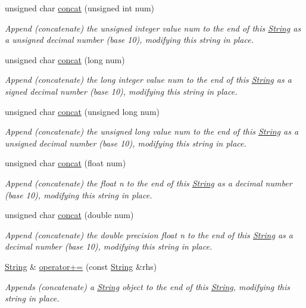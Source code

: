 \begin{DoxyCompactItemize}
unsigned char \hyperlink{class_string_af9c20f944d8a4687808017388047d155}{concat} (unsigned int num)
\begin{DoxyCompactList}\small\item\em Append (concatenate) the unsigned integer value num to the end of this \hyperlink{class_string}{String} as a unsigned decimal number (base 10), modifying this string in place. \end{DoxyCompactList}\item 
unsigned char \hyperlink{class_string_a92a456f8679a19d2221ec43841238ead}{concat} (long num)
\begin{DoxyCompactList}\small\item\em Append (concatenate) the long integer value num to the end of this \hyperlink{class_string}{String} as a signed decimal number (base 10), modifying this string in place. \end{DoxyCompactList}\item 
unsigned char \hyperlink{class_string_ad502777b7549182fe9b1a14879acf307}{concat} (unsigned long num)
\begin{DoxyCompactList}\small\item\em Append (concatenate) the unsigned long value num to the end of this \hyperlink{class_string}{String} as a unsigned decimal number (base 10), modifying this string in place. \end{DoxyCompactList}\item 
unsigned char \hyperlink{class_string_af6029b556adb9a23d82d1f276ce4f8ee}{concat} (float num)
\begin{DoxyCompactList}\small\item\em Append (concatenate) the float n to the end of this \hyperlink{class_string}{String} as a decimal number (base 10), modifying this string in place. \end{DoxyCompactList}\item 
unsigned char \hyperlink{class_string_ab1e52143c6057122a71db07ed1c7fb0e}{concat} (double num)
\begin{DoxyCompactList}\small\item\em Append (concatenate) the double precision float n to the end of this \hyperlink{class_string}{String} as a decimal number (base 10), modifying this string in place. \end{DoxyCompactList}\item 
\hyperlink{class_string}{String} \& \hyperlink{class_string_a5a3f29c49cc46fb598fc41767a83dabc}{operator+=} (const \hyperlink{class_string}{String} \&rhs)
\begin{DoxyCompactList}\small\item\em Appends (concatenate) a \hyperlink{class_string}{String} object to the end of this \hyperlink{class_string}{String}, modifying this string in place. \end{DoxyCompactList}\item 

\end{DoxyCompactItemize}
